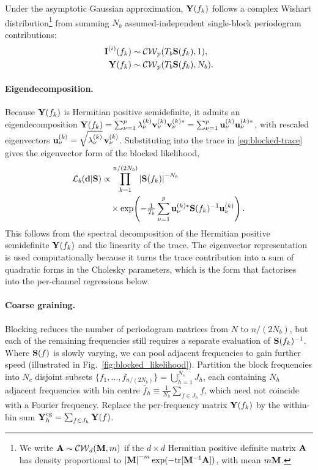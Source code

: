 \documentclass[%
	reprint,
	nofootinbib,
	amsmath,
	amssymb,
	aps,
]{revtex4-2}
\renewcommand{\d}{{\bf d}}
\renewcommand{\S}{{\bf S}}
\newcommand{\A}{{\bf A}}
\newcommand{\Y}{{\bf Y}}
\newcommand{\tr}{\mbox{tr}}
\newcommand{\I}{\mbox{{\bf I}}}
\newcommand{\M}{{\bf M}}
\renewcommand{\u}{\mathbf {u}}
\renewcommand{\v}{{\bf v}}
\begin{document}
	Under the asymptotic Gaussian approximation, $\Y(f_{k})$ follows a
	complex Wishart distribution\footnote{We write
	$\A\sim\mathcal{CW}_{d}(\M,m)$ if the $d\times d$ Hermitian positive
	definite matrix $\A$ has density proportional to
	$\left|\M\right|^{-m}\exp(-\tr[\M^{-1}\A])$, with mean $m\M$.}
	from summing $N_{b}$ assumed-independent single-block periodogram
	contributions:
	\begin{align}
	\I^{(i)}(f_{k})&\sim\mathcal{CW}_{p}(T_{b}\S(f_{k}),1),\\
	\Y(f_{k})&\sim\mathcal{CW}_{p}(T_{b}\S(f_{k}),N_{b}).
	\end{align}
	\paragraph*{Eigendecomposition.}
	Because $\Y(f_{k})$ is Hermitian positive semidefinite, it admits an
	eigendecomposition
	$\Y(f_{k})=\sum_{\nu=1}^{p}\lambda^{(k)}_{\nu}\v^{(k)}_{\nu}\v^{(k)*}_{\nu}
	=\sum_{\nu=1}^{p}\u^{(k)}_{\nu}\u^{(k)*}_{\nu}$,
	with rescaled eigenvectors
	$\u^{(k)}_{\nu}=\sqrt{\lambda^{(k)}_{\nu}}\,\v^{(k)}_{\nu}$.
	Substituting into the trace in \eqref{eq:blocked-trace} gives the
	eigenvector form of the blocked likelihood,
	\begin{align}
		\mathcal{L}_{b}(\d|\S)
		&\propto \prod_{k=1}^{n/(2N_{b})}
		\left|\S(f_{k})\right|^{-N_{b}} \nonumber\\
		&\quad\times
		\exp\!\left(-\tfrac{1}{T_{b}}\sum_{\nu=1}^{p}
		\u_{\nu}^{(k)*}\S(f_{k})^{-1}\u_{\nu}^{(k)}\right).
		\label{eq:log-like}
	\end{align}
	This follows from the spectral decomposition of the Hermitian positive
	semidefinite $\Y(f_k)$ and the linearity of the trace. The
	eigenvector representation is used computationally because it turns the
	trace contribution into a sum of quadratic forms in the Cholesky
	parameters, which is the form that factorises into the per-channel
	regressions below.

	\paragraph*{Coarse graining.}
	Blocking reduces the number of periodogram matrices from $N$ to
	$n/(2N_{b})$, but each of the remaining frequencies still requires a
	separate evaluation of $\S(f_{k})^{-1}$. Where $\S(f)$ is slowly
	varying, we can pool adjacent frequencies to gain further speed
	(illustrated in Fig.~\ref{fig:blocked_likelihood}). Partition the block frequencies into
	$N_{c}$ disjoint subsets
	$\{f_{1},\ldots,f_{n/(2N_{b})}\}=\bigcup_{h=1}^{N_{c}}J_{h}$, each
	containing $N_{h}$ adjacent frequencies with bin centre
	$\bar{f}_{h}\equiv \tfrac{1}{N_{h}}\sum_{f\in J_{h}} f$, which need
	not coincide with a Fourier frequency.
	Replace the per-frequency matrix $\Y(f_{k})$ by the within-bin sum
	$\Y_{h}^{\mathrm{cg}}=\sum_{f\in J_{h}}\Y(f)$. 
\end{document}
